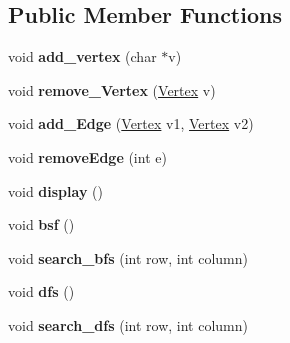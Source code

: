 \subsection*{Public Member Functions}
\begin{DoxyCompactItemize}
\item 
\hypertarget{class_grafo_a3972f2c3bba286846dc48a63e49c638f}{void {\bfseries add\+\_\+vertex} (char $\ast$v)}\label{class_grafo_a3972f2c3bba286846dc48a63e49c638f}

\item 
\hypertarget{class_grafo_af798c61940a5fa26f160527c6f1ce800}{void {\bfseries remove\+\_\+\+Vertex} (\hyperlink{class_vertex}{Vertex} v)}\label{class_grafo_af798c61940a5fa26f160527c6f1ce800}

\item 
\hypertarget{class_grafo_ae1e62139433ab16cab3373e081e5f550}{void {\bfseries add\+\_\+\+Edge} (\hyperlink{class_vertex}{Vertex} v1, \hyperlink{class_vertex}{Vertex} v2)}\label{class_grafo_ae1e62139433ab16cab3373e081e5f550}

\item 
\hypertarget{class_grafo_ab9e96aabff359c0fec42179fe9a7d399}{void {\bfseries remove\+Edge} (int e)}\label{class_grafo_ab9e96aabff359c0fec42179fe9a7d399}

\item 
\hypertarget{class_grafo_a7fe03adf9aa8c7a316c23d29a49a9656}{void {\bfseries display} ()}\label{class_grafo_a7fe03adf9aa8c7a316c23d29a49a9656}

\item 
\hypertarget{class_grafo_af2826ab22e0e0fd540e1e846fdb2f7b9}{void {\bfseries bsf} ()}\label{class_grafo_af2826ab22e0e0fd540e1e846fdb2f7b9}

\item 
\hypertarget{class_grafo_a5c8a97350ac29ca22fca595e6b7e0d8f}{void {\bfseries search\+\_\+bfs} (int row, int column)}\label{class_grafo_a5c8a97350ac29ca22fca595e6b7e0d8f}

\item 
\hypertarget{class_grafo_a05a8f2152dd30308ca6ae5ec1227b5c3}{void {\bfseries dfs} ()}\label{class_grafo_a05a8f2152dd30308ca6ae5ec1227b5c3}

\item 
\hypertarget{class_grafo_aa75699ac87ede7cc285f4ce926e3d2df}{void {\bfseries search\+\_\+dfs} (int row, int column)}\label{class_grafo_aa75699ac87ede7cc285f4ce926e3d2df}

\end{DoxyCompactItemize}
